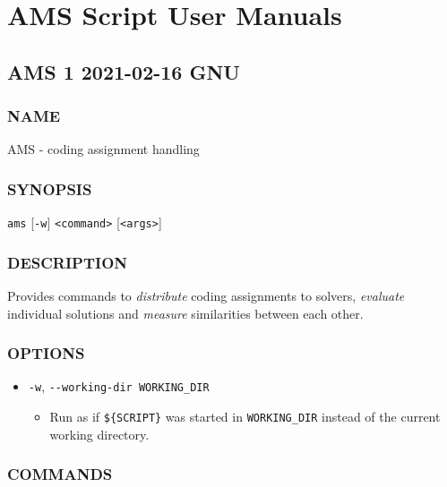 \chapter{AMS Script User Manuals}\label{apx:ams-documentation}

\section{AMS 1 2021-02-16 GNU}\label{ams-1-2021-02-16-gnu-user-manuals}

\subsection{NAME}\label{name}

AMS - coding assignment handling

\subsection{SYNOPSIS}\label{synopsis}

\texttt{ams} {[}\texttt{-w}{]} \texttt{\textless{}command\textgreater{}} {[}\texttt{\textless{}args\textgreater{}}{]}

\subsection{DESCRIPTION}\label{description}

Provides commands to \emph{distribute} coding assignments to solvers, \emph{evaluate} individual solutions and \emph{measure} similarities between each other.

\subsection{OPTIONS}\label{options}

\begin{itemize}
\item
  \texttt{-w}, \texttt{-\/-working-dir\ WORKING\_DIR}

  \begin{itemize}
  \item
    Run as if \texttt{\$\{SCRIPT\}} was started in \texttt{WORKING\_DIR} instead of the current working directory.
  \end{itemize}
\end{itemize}

\subsection{COMMANDS}\label{commands}

